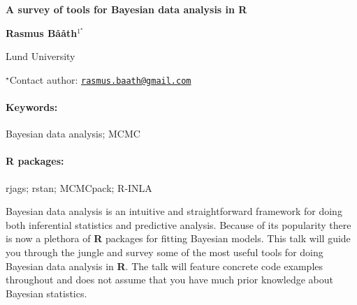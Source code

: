 \documentclass[11pt, a4paper]{article}
\renewcommand{\title}[1]{\begin{center}{\bf \LARGE #1}\end{center}}
\newcommand{\keywords}{\paragraph{Keywords:}}
\newcommand{\packages}{\paragraph{R packages:}}
\begin{document}
\pagestyle{empty}

\title{A survey of tools for Bayesian data analysis in R}

\begin{center}
  {\bf Rasmus Bååth$^{1^\star}$}
\end{center}

\vskip 0.3cm

\begin{affiliations}
\begin{enumerate}
\begin{minipage}{0.915\textwidth}
\centering
\item Lund University \\[-2pt]
\end{minipage}
\end{enumerate}
$^\star$Contact author: \href{mailto:rasmus.baath@gmail.com}{\nolinkurl{rasmus.baath@gmail.com}}\\
\end{affiliations}

\vskip 0.5cm

\begin{minipage}{0.915\textwidth}
\keywords Bayesian data analysis; MCMC
\packages rjags; rstan; MCMCpack; R-INLA
\end{minipage}

\vskip 0.8cm

Bayesian data analysis is an intuitive and straightforward framework for
doing both inferential statistics and predictive analysis. Because of
its popularity there is now a plethora of \textbf{R} packages for
fitting Bayesian models. This talk will guide you through the jungle and
survey some of the most useful tools for doing Bayesian data analysis in
\textbf{R}. The talk will feature concrete code examples throughout and
does not assume that you have much prior knowledge about Bayesian
statistics.
\end{document}
